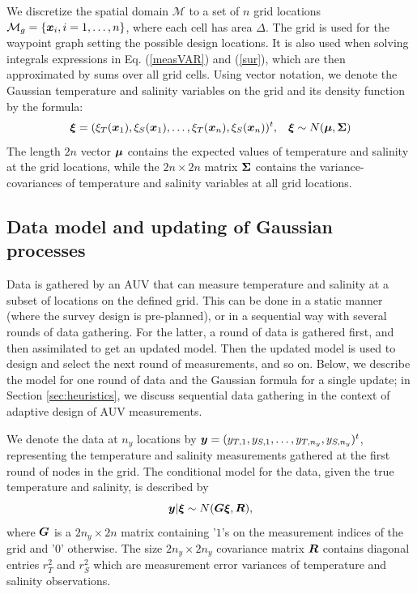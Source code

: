 \documentclass[aoas]{imsart}
\begin{document}
We discretize the spatial domain
$\mathcal{M}$ to a set of $n$ grid locations
$\mathcal{M}_g = \{{\boldsymbol x}_i, i=1,\ldots,n \}$, where each cell has area $\Delta$. The
grid is used for the waypoint graph setting the possible design locations. It is also used when solving integrals expressions in Eq. (\ref{measVAR}) and
(\ref{sur}), which are then approximated by sums over all grid cells.  Using vector
notation, we denote the Gaussian temperature and salinity variables on
the grid and its density function by the formula: 
\begin{equation}\label{prior}
    \bxi = (\xi_T(\bx_1),\xi_S(\bx_1),\ldots,\xi_T(\bx_n),\xi_S(\bx_n))^t, \hspace{3mm}
    \bxi  \sim  N(\bmu, \bSigma) %
\end{equation}
The length $2 n$ vector ${\boldsymbol \mu}$ contains the expected values of
temperature and salinity at the grid locations, while the
$2n \times 2n$ matrix ${\boldsymbol \Sigma}$ contains the
variance-covariances of temperature and salinity variables at all grid
locations.

\subsection{Data model and updating of Gaussian processes}

Data is gathered by an AUV that can measure temperature and salinity
at a subset of locations on the defined grid. This can be done in a
static manner (where the survey design is pre-planned), or in a
sequential way with several rounds of data gathering. For the latter,
a round of data is gathered first, and then assimilated to get an
updated model. Then the updated model is used to design and select the
next round of measurements, and so on. Below, we describe the model for one round of data and the Gaussian formula for a single update; in Section \ref{sec:heuristics}, we discuss sequential data gathering in the context of adaptive design of AUV measurements.

We denote the data at $n_y$ locations by
${\boldsymbol y}=(y_{T,1},y_{S,1},\ldots,y_{T,n_y},y_{S,n_y})^t$, representing the
temperature and salinity measurements gathered at the first round of
nodes in the grid. The conditional model for the data, given the true temperature
and salinity, is described by 
\begin{equation}\label{likelihood}
\by | \bxi \sim N( \bG \bxi, \bR), %
\end{equation}
where ${\boldsymbol G}$ is a $2n_y \times 2n$ matrix containing '$1$'s on the
measurement indices of the grid and '$0$' otherwise. The size
$2n_y \times 2n_y$ covariance matrix ${\boldsymbol R}$ contains diagonal entries
$r^2_T$ and $r^2_S$ which are measurement error variances of
temperature and salinity observations.
\end{document}
